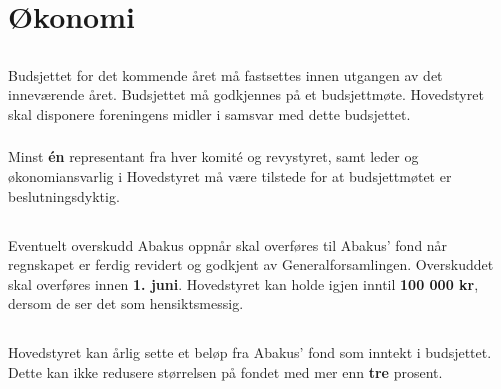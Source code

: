 \section{Økonomi}
\subsection{}
Budsjettet for det kommende året må fastsettes innen utgangen av det inneværende året. 
Budsjettet må godkjennes på et budsjettmøte. Hovedstyret skal disponere foreningens midler i samsvar med dette budsjettet.

\subsubsection{}
Minst \textbf{én} representant fra hver komité og revystyret, samt leder og økonomiansvarlig i 
Hovedstyret må være tilstede for at budsjettmøtet er beslutningsdyktig.

\subsection{}
Eventuelt overskudd Abakus oppnår skal overføres til Abakus’ fond når regnskapet er ferdig revidert og 
godkjent av Generalforsamlingen. Overskuddet skal overføres innen \textbf{1. juni}. 
Hovedstyret kan holde igjen inntil \textbf{100 000 kr}, dersom de ser det som hensiktsmessig.

\subsection{}
Hovedstyret kan årlig sette et beløp fra Abakus’ fond som inntekt i budsjettet. Dette kan ikke 
redusere størrelsen på fondet med mer enn \textbf{tre} prosent.
